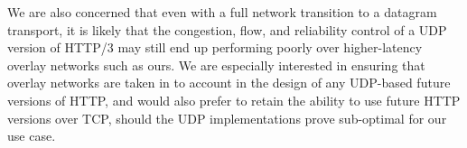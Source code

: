 \documentclass[letterpaper,11pt]{llncs}
\begin{document}
We are also concerned that even with a full network transition to a datagram
transport, it is likely that the congestion, flow, and reliability control of
a UDP version of HTTP/3 may still end up performing poorly over higher-latency
overlay networks such as ours. We are especially interested in ensuring that
overlay networks are taken in to account in the design of any UDP-based future
versions of HTTP, and would also prefer to retain the ability to use future
HTTP versions over TCP, should the UDP implementations prove sub-optimal for
our use case.



 

\clearpage
\appendix
\end{document}

